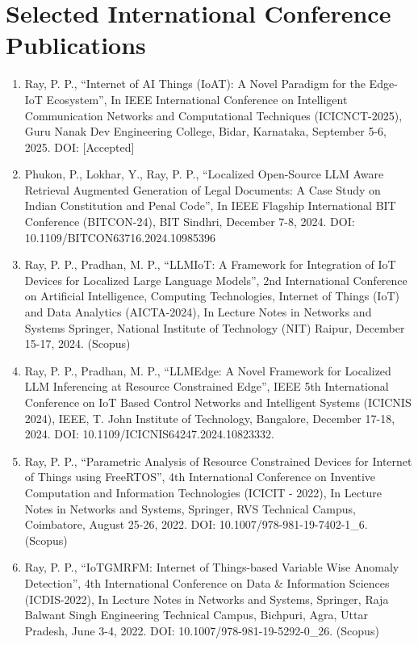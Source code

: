 \documentclass[11pt,a4paper]{moderncv}
\begin{document}
\section{\textbf{Selected International Conference Publications}}

\begin{adjustwidth}{6em}{0pt}
	\begin{enumerate}
	
	\item 	Ray, P. P., “Internet of AI Things (IoAT): A Novel Paradigm for the Edge-IoT Ecosystem”, In IEEE International Conference on Intelligent Communication Networks and Computational Techniques (ICICNCT-2025), Guru Nanak Dev Engineering College, Bidar, Karnataka, September 5-6, 2025. DOI: [Accepted]


	\item Phukon, P., Lokhar, Y., Ray, P. P., “Localized Open-Source LLM Aware Retrieval Augmented Generation of Legal Documents: A Case Study on Indian Constitution and Penal Code”, In IEEE Flagship International BIT Conference (BITCON-24), BIT Sindhri, December 7-8, 2024. DOI: 10.1109/BITCON63716.2024.10985396 
	
	\item Ray, P. P., Pradhan, M. P., “LLMIoT: A Framework for Integration of IoT Devices for Localized Large Language Models”, 2nd International Conference on Artificial Intelligence, Computing Technologies, Internet of Things (IoT) and Data Analytics (AICTA-2024), In Lecture Notes in Networks and Systems Springer, National Institute of Technology (NIT) Raipur, December 15-17, 2024. (Scopus)
	
	\item Ray, P. P., Pradhan, M. P., “LLMEdge: A Novel Framework for Localized LLM Inferencing at Resource Constrained Edge”, IEEE 5th International Conference on IoT Based Control Networks and Intelligent Systems (ICICNIS 2024), IEEE, T. John Institute of Technology, Bangalore, December 17-18, 2024. DOI: 10.1109/ICICNIS64247.2024.10823332.
	
	\item Ray, P. P., “Parametric Analysis of Resource Constrained Devices for Internet of Things using FreeRTOS”, 4th International Conference on Inventive Computation and Information Technologies (ICICIT - 2022), In Lecture Notes in Networks and Systems, Springer, RVS Technical Campus, Coimbatore, August 25-26, 2022. DOI: 10.1007/978-981-19-7402-1\_6. (Scopus)
	
	\item Ray, P. P., “IoTGMRFM: Internet of Things-based Variable Wise Anomaly Detection”, 4th International Conference on Data \& Information Sciences (ICDIS-2022), In Lecture Notes in Networks and Systems, Springer, Raja Balwant Singh Engineering Technical Campus, Bichpuri, Agra, Uttar Pradesh, June 3-4, 2022. DOI: 10.1007/978-981-19-5292-0\_26. (Scopus)
	

\end{enumerate}
\end{adjustwidth}
\end{document}
